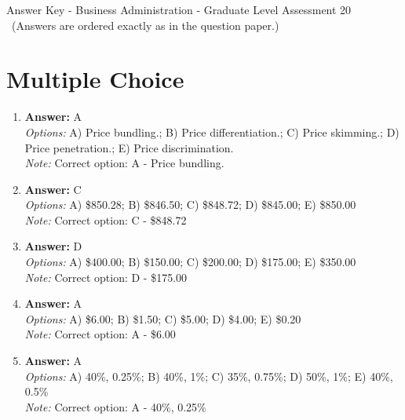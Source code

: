 \documentclass[12pt]{article}
\begin{document}
\begin{center}
Answer Key - Business Administration - Graduate Level Assessment 20 \
\small (Answers are ordered exactly as in the question paper.)
\end{center}

\section*{Multiple Choice}
\begin{enumerate}[label=\arabic*.]
\item \textbf{Answer:} A
\\ \textit{Options:} A) Price bundling.; B) Price differentiation.; C) Price skimming.; D) Price penetration.; E) Price discrimination.
\\ \textit{Note:} Correct option: A - Price bundling.
\item \textbf{Answer:} C
\\ \textit{Options:} A) \$850.28; B) \$846.50; C) \$848.72; D) \$845.00; E) \$850.00
\\ \textit{Note:} Correct option: C - \$848.72
\item \textbf{Answer:} D
\\ \textit{Options:} A) \$400.00; B) \$150.00; C) \$200.00; D) \$175.00; E) \$350.00
\\ \textit{Note:} Correct option: D - \$175.00
\item \textbf{Answer:} A
\\ \textit{Options:} A) \$6.00; B) \$1.50; C) \$5.00; D) \$4.00; E) \$0.20
\\ \textit{Note:} Correct option: A - \$6.00
\item \textbf{Answer:} A
\\ \textit{Options:} A) 40\%, 0.25\%; B) 40\%, 1\%; C) 35\%, 0.75\%; D) 50\%, 1\%; E) 40\%, 0.5\%
\\ \textit{Note:} Correct option: A - 40\%, 0.25\%
\end{enumerate}
\end{document}
